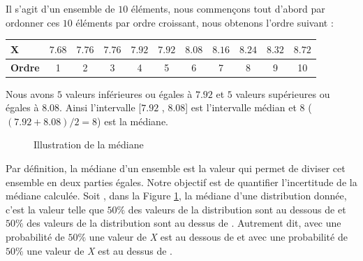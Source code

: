 Il s'agit d'un ensemble de $10$ éléments, nous commençons tout d'abord par ordonner ces $10$ éléments  par ordre croissant, nous obtenons l'ordre suivant :

\begin{table}[H]
	\centering
\begin{tabular}{lccccc!{\color{red}\vrule}ccccc}
\textbf{X}&	$ 7.68 $& $ 7.76 $& $ 7.76 $& $ 7.92 $& $ 7.92 $& $ 8.08  $& $ 8.16 $& $ 8.24 $& $ 8.32 $& $ 8.72 $\\ \hline
\textbf{Ordre}&	1&2&3&4&5&6&7&8&9&10\\
\end{tabular}
\end{table}

Nous avons $5$ valeurs inférieures ou égales à  $7.92$ et $5$ valeurs supérieures ou égales à $ 8.08 $. Ainsi l'intervalle [$ 7.92 $ , $ 8.08 $] est l'intervalle médian
et   $8$ ( $(7.92 + 8.08)/2 = 8 $) est la médiane.
\begin{figure}
	\captionsetup{justification=centering}

	\resizebox{.4\textwidth}{!}{
		

	}
			\caption{Illustration de la médiane}\label{fig:medianIllustration}
\end{figure} 
 Par définition, la médiane d'un ensemble est la valeur qui permet de diviser cet ensemble en deux parties égales. Notre objectif est de quantifier  l'incertitude de la médiane calculée.
Soit \textmu, dans la Figure \ref{fig:medianIllustration},  la médiane d'une distribution donnée, c'est la valeur telle que $50\%$ des valeurs de la distribution sont au dessous de {\textmu}  et $50\%$ des valeurs de la distribution sont au dessus de  \textmu. Autrement dit, avec une probabilité de $50\%$ une valeur de \textit{X} est au dessous de {\textmu}  et avec une probabilité de $50\%$ une valeur de \textit{X} est au dessus de \textmu.

